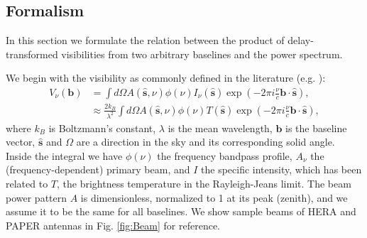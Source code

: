\documentclass[twocolumn,apj,numberedappendix]{emulateapj}
\renewcommand\[{\begin{equation}}
\renewcommand\]{\end{equation}}
\begin{document}
\subsection{Formalism}
In this section we formulate the relation between 
the product of delay-transformed visibilities from two arbitrary baselines and the power spectrum. 

We begin with the visibility as commonly defined in the literature (e.g.
\citealt{first-paper}): 
\begin{equation}
\begin{aligned}V_{\nu}(\boldsymbol{b}) & =\int d\Omega A(\hat{\boldsymbol{s}},\nu)\phi(\nu)I_{\nu}(\hat{\boldsymbol{s}})\exp\left(-2\pi i\frac{\nu}{c}\boldsymbol{b}\cdot\hat{\boldsymbol{s}}\right),\\
 & \approx\frac{2k_{B}}{\lambda^{2}}\int d\Omega A(\hat{\boldsymbol{s}},\nu)\phi(\nu)T(\hat{\boldsymbol{s}})\exp\left(-2\pi i\frac{\nu}{c}\boldsymbol{b}\cdot\hat{\boldsymbol{s}}\right),
\end{aligned}
\label{eq:Vis1}
\end{equation}
where $k_B$ is Boltzmann's constant, $\lambda$ is the mean wavelength, $\boldsymbol{b}$ is the baseline vector, $\hat{\boldsymbol{s}}$ and $\Omega$ are a direction in the
sky and its corresponding solid angle. Inside the integral we have $\phi(\nu)$ the frequency bandpass profile, $A_{\nu}$ the (frequency-dependent) primary beam, and $I$ the specific intensity, which has been
related to $T$, the brightness temperature in the Rayleigh-Jeans
limit. The beam power pattern $A$ is dimensionless,
normalized to 1 at its peak (zenith), and we assume it to be the same
for all baselines. We show sample beams of HERA and PAPER antennas in Fig. \ref{fig:Beam} for reference. 
\end{document}
